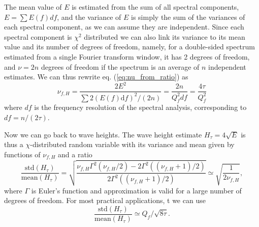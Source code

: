 {The mean value of $E$ is estimated from the sum of all spectral components, $E= \sum E(f) df$, and the variance of $E$ is simply the sum of the variances of each spectral component, as we can assume they are independent. Since each spectral component is $\chi^2$ distributed we can also link its variance to its mean value and its number of degrees of freedom, namely, for a double-sided spectrum estimated from a single Fourier transform window, it has 2 degrees of freedom, and $\nu=2 n$ degrees of freedom if the spectrum is an average of $n$ independent estimates.  We can thus rewrite eq. (\ref{eq:nu_from_ratio}) as 
\begin{equation}
\nu_{f,H}=\frac{2 E^2}{\sum 2 ( E (f)\mathrm{d}f)^2 / (2n)}=\frac{2n}{ Q_f^2 df}=\frac{4 \tau}{ Q_f^2} \label{eq:nuf}
\end{equation}
 where $df$ is the frequency resolution of the spectral analysis, corresponding to $df=n/(2 \tau)$. 
 
 Now we can go back to wave heights. The wave height estimate $H_\tau=4\sqrt{E}$ is thus a $\chi$-distributed random variable with its variance and mean given by  functions of $\nu_{f,H}$ and a ratio 
 \begin{equation}
\frac{\mathrm{std}(H_\tau)}{\mathrm{mean}(H_\tau)} =\sqrt{\frac{\nu_{f,H}\Gamma^2(\nu_{f,H}/2)-2 \Gamma^2((\nu_{f,H}+1)/2) }{2 \Gamma^2((\nu_{f,H}+1)/2)}} \simeq \sqrt{\frac{1}{2 \nu_{f,H}}},
   \label{eq:groups_var_nu}
\end{equation}
 where $\Gamma$ is Euler's function and  approximation is valid for a large number of degrees of freedom. 
For most practical applications, t we can use
\begin{equation}
\frac{\mathrm{std}(H_\tau)}{\mathrm{mean}(H_\tau)} \simeq  Q_f / \sqrt{ 8  \tau }.
   \label{eq:groups_var_1DY}
\end{equation}


}
